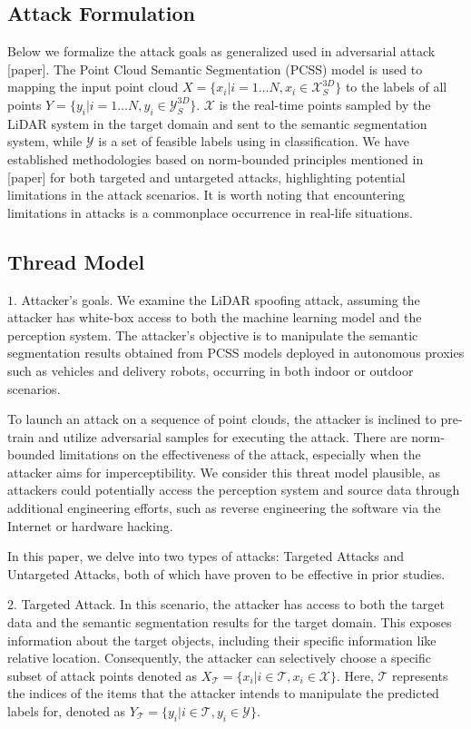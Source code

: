 \documentclass[conference]{IEEEtran}
\begin{document}
\subsection{Attack Formulation}
Below we formalize the attack goals as generalized used in adversarial attack [paper]. The Point Cloud Semantic Segmentation (PCSS) model is used to mapping the input point cloud $X=\{x_i|i=1{\ldots}N,x_i\in\mathcal{X}_S^{3D}\}$ to the labels of all points $Y=\{y_i|i=1{\ldots}N,y_i\in \mathcal{Y}_S^{3D}\}$. $\mathcal{X}$ is the real-time points  sampled by the LiDAR system in the target domain and sent to the semantic segmentation system, while $\mathcal{Y}$ is a set of feasible labels using in classification. We have established methodologies based on norm-bounded principles mentioned in [paper] for both targeted and untargeted attacks, highlighting potential limitations in the attack scenarios. It is worth noting that encountering limitations in attacks is a commonplace occurrence in real-life situations.

\subsection{Thread Model}
$1$. Attacker's goals. We examine the LiDAR spoofing attack, assuming the attacker has white-box access to both the machine learning model and the perception system. The attacker's objective is to manipulate the semantic segmentation results obtained from PCSS models deployed in autonomous proxies such as vehicles and delivery robots, occurring in both indoor or outdoor scenarios.

To launch an attack on a sequence of point clouds, the attacker is inclined to pre-train and utilize adversarial samples for executing the attack. There are norm-bounded limitations on the effectiveness of the attack, especially when the attacker aims for imperceptibility. We consider this threat model plausible, as attackers could potentially access the perception system and source data through additional engineering efforts, such as reverse engineering the software via the Internet or hardware hacking.

In this paper, we delve into two types of attacks: Targeted Attacks and Untargeted Attacks, both of which have proven to be effective in prior studies. 

$2$. Targeted Attack. In this scenario, the attacker has access to both the target data and the semantic segmentation results for the target domain. This exposes information about the target objects, including their specific information like relative location. Consequently, the attacker can selectively choose a specific subset of attack points denoted as $X_{\mathcal{T}}=\{x_{i}|i\in{\mathcal{T}},x_{i}\in \mathcal{X}\}$. Here, $\mathcal{T}$ represents the indices of the items that the attacker intends to manipulate the predicted labels for, denoted as $Y_\mathcal{T}=\{y_i|i\in \mathcal{T},y_i\in{\mathcal{Y}}\}$. 
\end{document}
